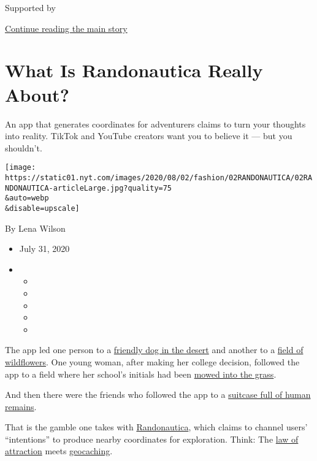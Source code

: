 Supported by

\protect\hyperlink{after-sponsor}{Continue reading the main story}

\hypertarget{what-is-randonautica-really-about}{%
\section{What Is Randonautica Really
About?}\label{what-is-randonautica-really-about}}

An app that generates coordinates for adventurers claims to turn your
thoughts into reality. TikTok and YouTube creators want you to believe
it --- but you shouldn't.

\texttt{[image: https://static01.nyt.com/images/2020/08/02/fashion/02RANDONAUTICA/02RANDONAUTICA-articleLarge.jpg?quality=75\\\&auto=webp\\\&disable=upscale]}

By Lena Wilson

\begin{itemize}
\item
  July 31, 2020
\item
  \begin{itemize}
  \item
  \item
  \item
  \item
  \item
  \end{itemize}
\end{itemize}

The app led one person to a
\href{https://vm.tiktok.com/JNK12b4/}{friendly dog in the desert} and
another to a
\href{https://www.reddit.com/r/randonauts/comments/hjfwea/first_time_intention_was_pretty_flowers_took_me/}{field
of wildflowers}. One young woman, after making her college decision,
followed the app to a field where her school's initials had been
\href{https://vm.tiktok.com/JNKFyW3/}{mowed into the grass}.

And then there were the friends who followed the app to a
\href{https://vm.tiktok.com/JNKJHA5/}{suitcase full of human remains}.

That is the gamble one takes with
\href{https://www.randonautica.com/}{Randonautica}, which claims to
channel users' ``intentions'' to produce nearby coordinates for
exploration. Think: The
\href{https://www.nytimes.com/2010/09/26/books/review/Chabris-t.html?searchResultPosition=5}{law
of attraction} meets
\href{https://www.nytimes.com/2018/08/29/nyregion/new-york-city-geocachers-paradise.html?searchResultPosition=3}{geocaching}.

